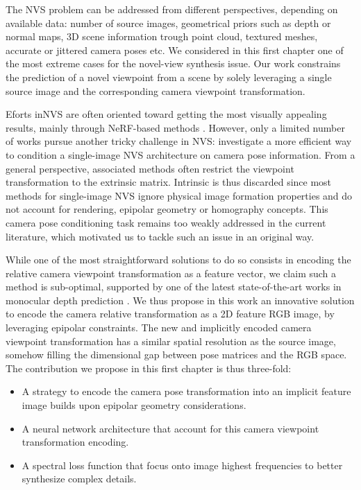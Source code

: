 The \ac{NVS} problem can be addressed from different perspectives, depending on available data: number of source images, geometrical priors such as depth or normal maps, 3D scene information trough point cloud, textured meshes, accurate or jittered camera poses etc. We considered in this first chapter one of the most extreme cases for the novel-view synthesis issue. Our work constrains the prediction of a novel viewpoint from a scene by solely leveraging a single source image and the corresponding camera viewpoint transformation. 

Eforts in\ac{NVS} are often oriented toward getting the most visually appealing results, mainly through \ac{NeRF}-based methods \citep{mildenhall2020nerf,wang2021neus,barron2021mip,barron2022mip}. However, only a limited number of works pursue another tricky challenge in \ac{NVS}: investigate a more efficient way to condition a single-image \ac{NVS} architecture on camera pose information. From a general perspective, associated methods often restrict the viewpoint transformation to the extrinsic matrix. Intrinsic is thus discarded since most methods for single-image \ac{NVS} ignore physical image formation properties and do not account for rendering, epipolar geometry or homography concepts. This camera pose conditioning task remains too weakly addressed in the current literature, which motivated us to tackle such an issue in an original way.

While one of the most straightforward solutions to do so consists in encoding the relative camera viewpoint transformation as a feature vector, we claim such a method is sub-optimal, supported by one of the latest state-of-the-art works in monocular depth prediction \citep{zhao2021camera}. We thus propose in this work an innovative solution to encode the camera relative transformation as a 2D feature RGB image, by leveraging epipolar constraints. The new and implicitly encoded camera viewpoint transformation has a similar spatial resolution as the source image, somehow filling the dimensional gap between pose matrices and the RGB space. The contribution we propose in this first chapter is thus three-fold: 
\begin{itemize}
	\item A strategy to encode the camera pose transformation into an implicit feature image builds upon epipolar geometry considerations. 
	\item A neural network architecture that account for this camera viewpoint transformation encoding. 
	\item A spectral loss function that focus onto image highest frequencies to better synthesize complex details.
\end{itemize}

